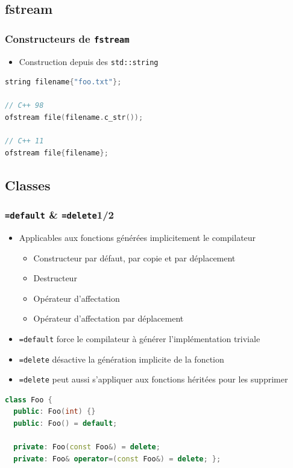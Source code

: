 \documentclass[C++.tex]{subfiles}
\begin{document}
\subsection*{fstream}
\begin{frame}[fragile]
	\frametitle{Constructeurs de \lstinline|fstream|}
	\begin{itemize}
		\item Construction depuis des \lstinline|std::string|
	\end{itemize}

	\begin{lstlisting}[language=C++]
string filename{"foo.txt"};

// C++ 98
ofstream file(filename.c_str());

// C++ 11
ofstream file{filename};\end{lstlisting}
\end{frame}

\subsection*{Classes}
\begin{frame}[fragile]
	\frametitle{\lstinline|=default| \& \lstinline|=delete|\titlehfill{}1/2}
	\begin{itemize}
		\item Applicables aux fonctions générées implicitement le compilateur
		\begin{itemize}
			\item Constructeur par défaut, par copie et par déplacement
			\item Destructeur
			\item Opérateur d'affectation
			\item Opérateur d'affectation par déplacement
		\end{itemize}
		\item \lstinline|=default| force le compilateur à générer l'implémentation \og triviale\fg{}
		\item \lstinline|=delete| désactive la génération implicite de la fonction
		\item \lstinline|=delete| peut aussi s'appliquer aux fonctions héritées pour les supprimer
	\end{itemize}


	\begin{lstlisting}[language=C++]
class Foo {
  public: Foo(int) {}
  public: Foo() = default;

  private: Foo(const Foo&) = delete;
  private: Foo& operator=(const Foo&) = delete; };\end{lstlisting}
\end{frame}
\end{document}
